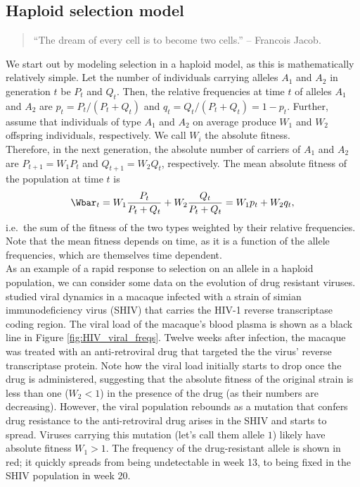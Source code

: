 \subsection{Haploid selection model}
\begin{quotation}
``The dream of every cell is to become two cells.'' -- Francois Jacob.
 \end{quotation} 


 
We start out by modeling selection in a haploid model, as this is mathematically relatively simple.
Let the number of individuals carrying alleles $A_1$ and $A_2$ in generation $t$ be $P_t$ and $Q_t$. Then, the relative frequencies at time $t$ of alleles $A_1$ and $A_2$ are $p_t = P_t / (P_t + Q_t)$ and $q_t = Q_t / (P_t + Q_t) = 1 - p_t$. Further, assume that individuals of type $A_1$ and $A_2$ on average produce $W_1$ and $W_2$ offspring individuals, respectively. We call $W_i$ the absolute fitness.\\

Therefore, in the next generation, the absolute number of carriers of $A_1$ and $A_2$ are $P_{t+1} = W_1 P_t$ and $Q_{t+1} = W_2 Q_t$, respectively. The mean absolute fitness of the population at time $t$ is
\begin{equation}
	\label{eq:meanAbsFit}
	\Wbar_t = W_1 \frac{P_t}{P_t + Q_t} + W_2 \frac{Q_t}{P_t + Q_t} = W_1 p_t + W_2 q_t,	
\end{equation}
i.e.\ the sum of the fitness of the two types weighted by their
relative frequencies. Note that the mean fitness depends on time, as
it is a function of the allele frequencies, which are themselves time
dependent. \\

As an example of a rapid response to selection on an allele in a haploid population, we can consider some data on the evolution of drug resistant viruses. \citet{feder2017} studied viral dynamics in a macaque infected with a strain of simian immunodeficiency virus (SHIV) that carries the HIV-1 reverse transcriptase coding region.  The viral load of the macaque's blood plasma is shown as a black line in Figure \ref{fig:HIV_viral_freqs}. Twelve weeks after infection, the macaque was treated with an anti-retroviral drug that targeted the the virus' reverse transcriptase protein. Note how the viral load initially starts to drop once the drug is administered, suggesting that the absolute fitness of the original strain is less than one ($W_{2}<1$) in the presence of the drug (as their numbers are decreasing). However, the viral population rebounds as a mutation  that confers drug resistance to the anti-retroviral drug arises in the SHIV and starts to spread. Viruses carrying this mutation (let's call them allele $1$) likely have absolute fitness $W_1>1$. The frequency of the drug-resistant allele is shown in red; it quickly spreads from being undetectable in week 13, to being fixed in the SHIV population in week 20.

